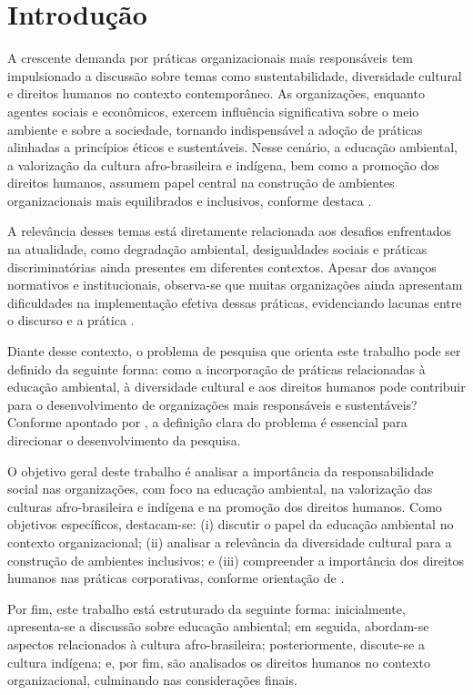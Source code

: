 \documentclass[
    12pt
    ,oneside
    ,a4paper
    ,chapter=TITLE
    ,section=TITLE
    ,sumario=abnt-6027-2012]{abntex2}
\begin{document}
\chapter{Introdução}

A crescente demanda por práticas organizacionais mais responsáveis tem impulsionado a discussão sobre temas como sustentabilidade, diversidade cultural e direitos humanos no contexto contemporâneo. As organizações, enquanto agentes sociais e econômicos, exercem influência significativa sobre o meio ambiente e sobre a sociedade, tornando indispensável a adoção de práticas alinhadas a princípios éticos e sustentáveis. Nesse cenário, a educação ambiental, a valorização da cultura afro-brasileira e indígena, bem como a promoção dos direitos humanos, assumem papel central na construção de ambientes organizacionais mais equilibrados e inclusivos, conforme destaca .

A relevância desses temas está diretamente relacionada aos desafios enfrentados na atualidade, como degradação ambiental, desigualdades sociais e práticas discriminatórias ainda presentes em diferentes contextos. Apesar dos avanços normativos e institucionais, observa-se que muitas organizações ainda apresentam dificuldades na implementação efetiva dessas práticas, evidenciando lacunas entre o discurso e a prática \cite{lakatos}.

Diante desse contexto, o problema de pesquisa que orienta este trabalho pode ser definido da seguinte forma: como a incorporação de práticas relacionadas à educação ambiental, à diversidade cultural e aos direitos humanos pode contribuir para o desenvolvimento de organizações mais responsáveis e sustentáveis? Conforme apontado por , a definição clara do problema é essencial para direcionar o desenvolvimento da pesquisa.

O objetivo geral deste trabalho é analisar a importância da responsabilidade social nas organizações, com foco na educação ambiental, na valorização das culturas afro-brasileira e indígena e na promoção dos direitos humanos. Como objetivos específicos, destacam-se: (i) discutir o papel da educação ambiental no contexto organizacional; (ii) analisar a relevância da diversidade cultural para a construção de ambientes inclusivos; e (iii) compreender a importância dos direitos humanos nas práticas corporativas, conforme orientação de .

Por fim, este trabalho está estruturado da seguinte forma: inicialmente, apresenta-se a discussão sobre educação ambiental; em seguida, abordam-se aspectos relacionados à cultura afro-brasileira; posteriormente, discute-se a cultura indígena; e, por fim, são analisados os direitos humanos no contexto organizacional, culminando nas considerações finais.
\end{document}
